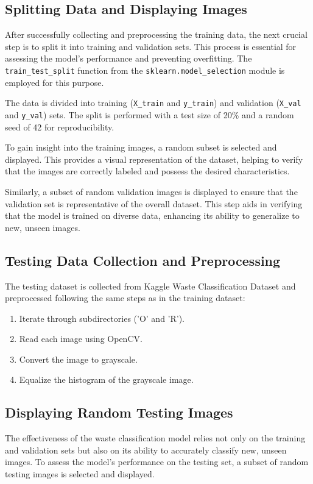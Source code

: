 \documentclass{article}
\begin{document}
\subsection{Splitting Data and Displaying Images}
After successfully collecting and preprocessing the training data, the next crucial step is to split it into training and validation sets. This process is essential for assessing the model's performance and preventing overfitting. The \texttt{train\_test\_split} function from the \texttt{sklearn.model\_selection} module is employed for this purpose.

The data is divided into training (\texttt{X\_train} and \texttt{y\_train}) and validation (\texttt{X\_val} and \texttt{y\_val}) sets. The split is performed with a test size of 20\% and a random seed of 42 for reproducibility.

To gain insight into the training images, a random subset is selected and displayed. This provides a visual representation of the dataset, helping to verify that the images are correctly labeled and possess the desired characteristics.

Similarly, a subset of random validation images is displayed to ensure that the validation set is representative of the overall dataset. This step aids in verifying that the model is trained on diverse data, enhancing its ability to generalize to new, unseen images.


\subsection{Testing Data Collection and Preprocessing}
The testing dataset is collected from Kaggle Waste Classification Dataset and preprocessed following the same steps as in the training dataset:

\begin{enumerate}
    \item Iterate through subdirectories ('O' and 'R').
    \item Read each image using OpenCV.
    \item Convert the image to grayscale.
    \item Equalize the histogram of the grayscale image.
\end{enumerate}


\subsection{Displaying Random Testing Images}
The effectiveness of the waste classification model relies not only on the training and validation sets but also on its ability to accurately classify new, unseen images. To assess the model's performance on the testing set, a subset of random testing images is selected and displayed.
\end{document}
